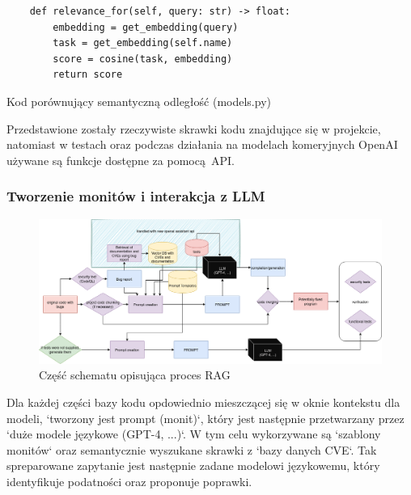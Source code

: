 \begin{listing}
    \begin{verbatim}  
    def relevance_for(self, query: str) -> float:
        embedding = get_embedding(query)
        task = get_embedding(self.name)
        score = cosine(task, embedding)
        return score
    \end{verbatim}
    \caption{Kod porównujący semantyczną odległość (models.py)} 
    \label{listing:vector_relevance}
\end{listing}
    
Przedstawione zostały rzeczywiste skrawki kodu znajdujące się w projekcie, natomiast w testach oraz podczas działania na modelach komeryjnych OpenAI używane są funkcje dostępne za pomocą API.

\subsubsection{Tworzenie monitów i interakcja z LLM}
\begin{figure}[h]
    \centering
    \includegraphics[clip, trim=3cm 10cm 3cm 0cm, width=0.9\linewidth]{img/gptester.drawio.png}
    \caption{Część schematu opisująca proces RAG}
    \label{fig:przyciety_obraz}
\end{figure}
Dla każdej części bazy kodu opdowiednio mieszczącej się w oknie kontekstu dla modeli, `tworzony jest prompt (monit)`, który jest następnie przetwarzany przez `duże modele językowe (GPT-4, ...)`. 
W tym celu wykorzywane są `szablony monitów` oraz semantycznie wyszukane skrawki z `bazy danych CVE`.
Tak spreparowane zapytanie jest następnie zadane modelowi językowemu, który identyfikuje podatności oraz proponuje poprawki.

